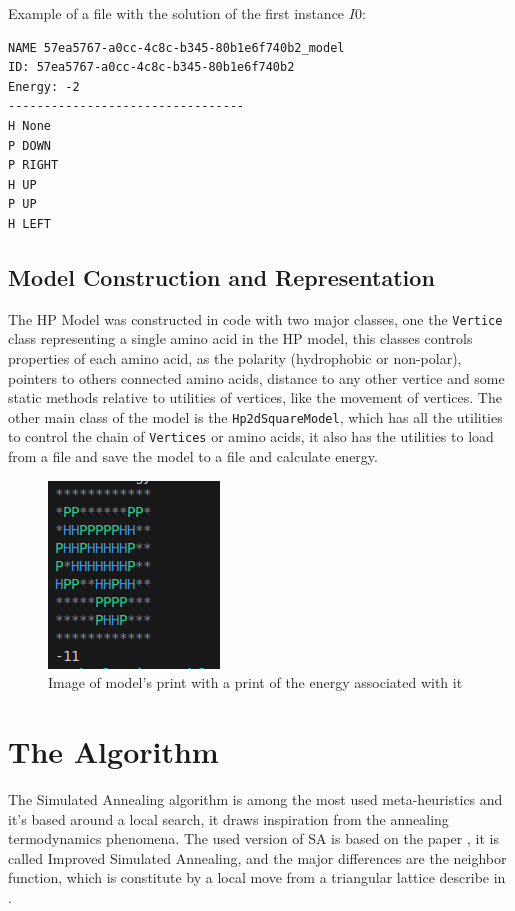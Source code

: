 \documentclass[10pt]{article}
\begin{document}
Example of a file with the solution of the first instance $I0$: 

\begin{lstlisting}
NAME 57ea5767-a0cc-4c8c-b345-80b1e6f740b2_model
ID: 57ea5767-a0cc-4c8c-b345-80b1e6f740b2
Energy: -2
---------------------------------
H None
P DOWN
P RIGHT
H UP
P UP
H LEFT
\end{lstlisting}

\subsection{Model Construction and Representation}

The HP Model was constructed in code with two major classes, one the \verb|Vertice| class representing a single amino acid in the HP model, this classes controls properties of each amino acid, as the polarity (hydrophobic or non-polar), pointers to others connected amino acids, distance to any other vertice and some static methods relative to utilities of vertices, like the movement of vertices. The other main class of the model is the \verb|Hp2dSquareModel|, which has all the utilities to control the chain of \verb|Vertices| or amino acids, it also has the utilities to load from a file and save the model to a file and calculate energy.

\begin{figure}
    \centering
    \includegraphics[width=0.35\linewidth]{example.png}
    \caption{Image of model's print with a print of the energy associated with it}
    \label{fig:enter-label}
\end{figure}

\section{The Algorithm}

The Simulated Annealing algorithm is among the most used meta-heuristics and it's based around a local search, it draws inspiration from the annealing termodynamics phenomena. The used version of SA is based on the paper \cite{SaInPFP}, it is called Improved Simulated Annealing, and the major differences are the neighbor function, which is constitute by a local move from a triangular lattice describe in \cite{LocalMoveSet} .
\end{document}
